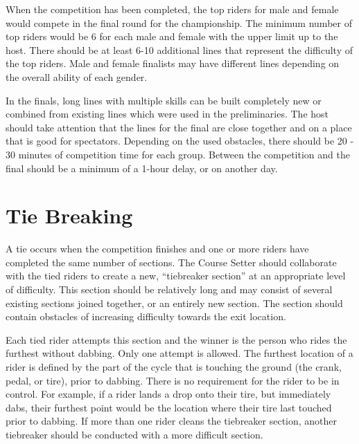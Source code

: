 When the competition has been completed, the top riders for male and female would compete in the final round for the championship.
The minimum number of top riders would be 6 for each male and female with the upper limit up to the host.
There should be at least 6-10 additional lines that represent the difficulty of the top riders.
Male and female finalists may have different lines depending on the overall ability of each gender.

In the finals, long lines with multiple skills can be built completely new or combined from existing lines which were used in the preliminaries.
The host should take attention that the lines for the final are close together and on a place that is good for spectators.
Depending on the used obstacles, there should be 20 - 30 minutes of competition time for each group.
Between the competition and the final should be a minimum of a 1-hour delay, or on another day.
 
\section{Tie Breaking}
A tie occurs when the competition finishes and one or more riders have completed the same number of sections.
The Course Setter should collaborate with the tied riders to create a new, ``tiebreaker section'' at an appropriate level of difficulty.
This section should be relatively long and may consist of several existing sections joined together, or an entirely new section.
The section should contain obstacles of increasing difficulty towards the exit location.

Each tied rider attempts this section and the winner is the person who rides the furthest without dabbing.
Only one attempt is allowed.
The furthest location of a rider is defined by the part of the cycle that is touching the ground (the crank, pedal, or tire), prior to dabbing.
There is no requirement for the rider to be in control.
For example, if a rider lands a drop onto their tire, but immediately dabs, their furthest point would be the location where their tire last touched prior to dabbing.
If more than one rider cleans the tiebreaker section, another tiebreaker should be conducted with a more difficult section.
